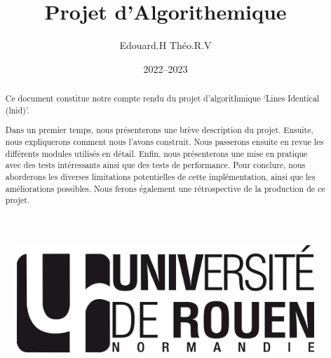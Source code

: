 \documentclass[12pt]{article}
\title{Projet d'Algorithemique}
\author{Edouard.H Théo.R.V}
\date{2022--2023}
\begin{document}
    \begin{figure}
        \includegraphics[scale=0.3, right]{logo-univ-rouen-normandie-noir.png}
    \end{figure}
    
    \maketitle

    \begin{abstract}
        Ce document constitue notre compte rendu du projet d'algorithmique 
        `Lines Identical (lnid)'.
        
        Dans un premier temps, nous présenterons une 
        brève description du projet. Ensuite, nous expliquerons comment nous 
        l'avons construit. Nous passerons ensuite en revue les différents 
        modules utilisés en détail. Enfin, nous présenterons une mise en 
        pratique avec des tests intéressants ainsi que des tests de performance.
        Pour conclure, nous aborderons les diverses limitations potentielles de 
        cette implémentation, ainsi que les améliorations possibles. Nous ferons
         également une rétrospective de la production de ce projet.
    \end{abstract}

    \newpage

    \tableofcontents

    \newpage
\end{document}
